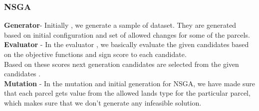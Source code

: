 \documentclass[twoside,10pt]{article}
\begin{document}
\subsubsection{NSGA}
\textbf{Generator}- Initially , we generate a sample of dataset. They are generated based on initial configuration and set of allowed changes for some of the parcels. \\[.15cm]
\textbf{Evaluator }- In the evaluator , we basically evaluate the  given candidates based on the objective functions and sign score to each candidate.\\
Based on these scores next generation candidates are selected from the given candidates . \\ [.15cm]
\textbf{Mutation }- In the mutation and initial generation for NSGA, we have made sure that each parcel gets value from the allowed lands type for the particular parcel, which makes sure that we don't generate any infeasible solution.\\[.35cm]
\end{document}

